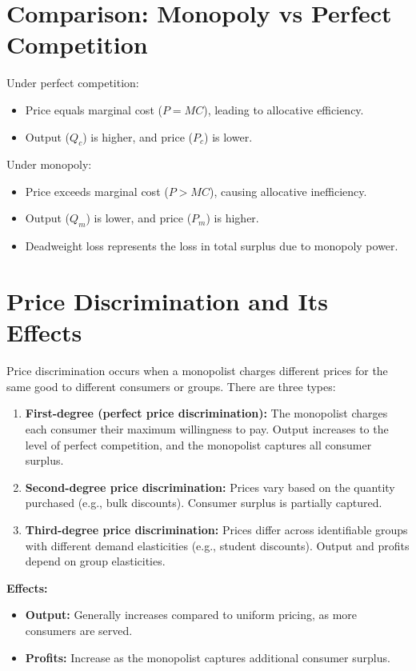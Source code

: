 \section*{Comparison: Monopoly vs Perfect Competition}
Under perfect competition:
\begin{itemize}
    \item Price equals marginal cost (\(P = MC\)), leading to allocative efficiency.
    \item Output (\(Q_c\)) is higher, and price (\(P_c\)) is lower.
\end{itemize}

Under monopoly:
\begin{itemize}
    \item Price exceeds marginal cost (\(P > MC\)), causing allocative inefficiency.
    \item Output (\(Q_m\)) is lower, and price (\(P_m\)) is higher.
    \item Deadweight loss represents the loss in total surplus due to monopoly power.
\end{itemize}

\section*{Price Discrimination and Its Effects}
Price discrimination occurs when a monopolist charges different prices for the same good to different consumers or groups. There are three types:
\begin{enumerate}
    \item \textbf{First-degree (perfect price discrimination):} The monopolist charges each consumer their maximum willingness to pay. Output increases to the level of perfect competition, and the monopolist captures all consumer surplus.
    \item \textbf{Second-degree price discrimination:} Prices vary based on the quantity purchased (e.g., bulk discounts). Consumer surplus is partially captured.
    \item \textbf{Third-degree price discrimination:} Prices differ across identifiable groups with different demand elasticities (e.g., student discounts). Output and profits depend on group elasticities.
\end{enumerate}

\textbf{Effects:}
\begin{itemize}
    \item \textbf{Output:} Generally increases compared to uniform pricing, as more consumers are served.
    \item \textbf{Profits:} Increase as the monopolist captures additional consumer surplus.
\end{itemize}

